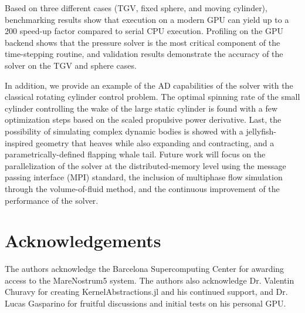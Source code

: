 \documentclass[10pt,a4paper]{article}
\begin{document}
Based on three different cases (TGV, fixed sphere, and moving cylinder), benchmarking results show that execution on a modern GPU can yield up to a 200 speed-up factor compared to serial CPU execution. Profiling on the GPU backend shows that the pressure solver is the most critical component of the time-stepping routine, and validation results demonstrate the accuracy of the solver on the TGV and sphere cases.

In addition, we provide an example of the AD capabilities of the solver with the classical rotating cylinder control problem. The optimal spinning rate of the small cylinder controlling the wake of the large static cylinder is found with a few optimization steps based on the scaled propulsive power derivative. Last, the possibility of simulating complex dynamic bodies is showed with a jellyfish-inspired geometry that heaves while also expanding and contracting, and a parametrically-defined flapping whale tail. Future work will focus on the parallelization of the solver at the distributed-memory level using the message passing interface (MPI) standard, the inclusion of multiphase flow simulation through the volume-of-fluid method, and the continuous improvement of the performance of the solver.

\section{Acknowledgements}\label{sec:acknowledgements}
The authors acknowledge the Barcelona Supercomputing Center for awarding access to the MareNostrum5 system. The authors also acknowledge Dr. Valentin Churavy for creating KernelAbstractions.jl and his continued support, and Dr. Lucas Gasparino for fruitful discussions and initial tests on his personal GPU.



\end{document}
